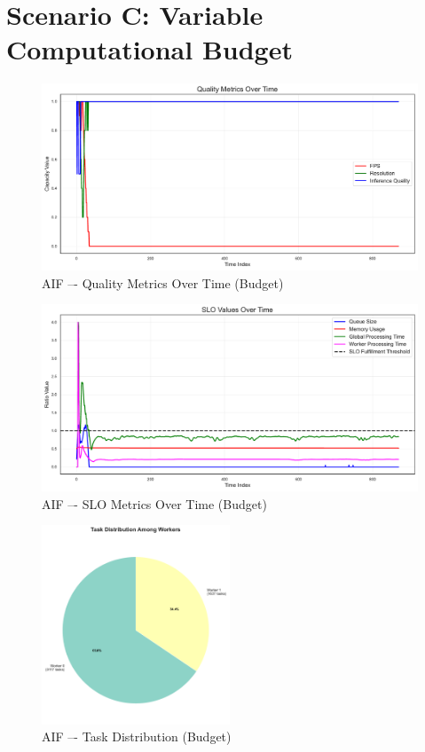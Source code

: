 \clearpage
\section{Scenario C: Variable Computational Budget}





\begin{figure}[h]
    \centering
    \includegraphics[width=\textwidth]{img/results/variable_computational_budget/active_inference_relative_control_quality_metrics.pdf}
    \caption{AIF –- Quality Metrics Over Time (Budget)}
\end{figure}
\begin{figure}[h]
    \centering
    \includegraphics[width=\textwidth]{img/results/variable_computational_budget/active_inference_relative_control_slo_values.pdf}
    \caption{AIF –- SLO Metrics Over Time (Budget)}
\end{figure}
\begin{figure}[h]
    \centering
    \includegraphics[width=0.5\textwidth]{img/results/variable_computational_budget/active_inference_relative_control_task_distribution_pie.pdf}
    \caption{AIF –- Task Distribution (Budget)}
\end{figure}


